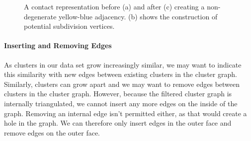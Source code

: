 \begin{figure}[H]
	\centering
	\quad
	\quad
	\caption{A contact representation before (a) and after (c) creating a non-degenerate yellow-blue adjacency. (b) shows the construction of potential subdivision vertices.}
	\label{fig:flip-edge-create-boundary}
\end{figure}



\paragraph{Inserting and Removing Edges}

As clusters in our data set grow increasingly similar, we may want to indicate this similarity with new edges between existing clusters in the cluster graph.
Similarly, clusters can grow apart and we may want to remove edges between clusters in the cluster graph.
However, because the filtered cluster graph is internally triangulated, we cannot insert any more edges on the inside of the graph.
Removing an internal edge isn't permitted either, as that would create a hole in the graph.
We can therefore only insert edges in the outer face and remove edges on the outer face.

